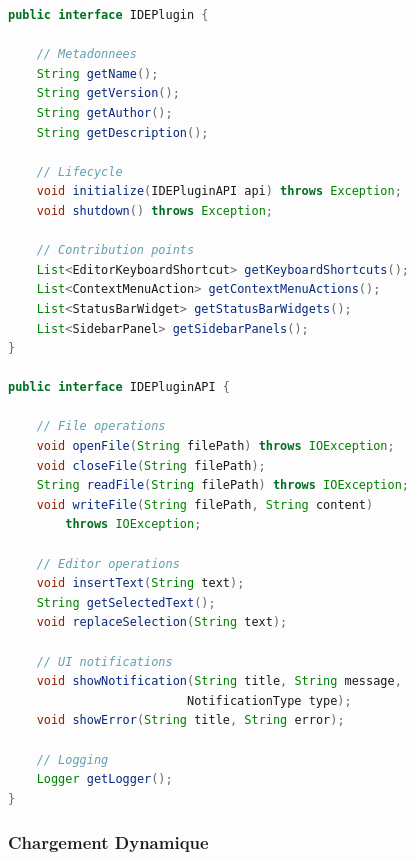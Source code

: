 \documentclass[11pt,a4paper,hidelinks]{book}
\begin{document}
\begin{lstlisting}[language=Java, caption={Interface du Plugin}]
public interface IDEPlugin {
    
    // Metadonnees
    String getName();
    String getVersion();
    String getAuthor();
    String getDescription();
    
    // Lifecycle
    void initialize(IDEPluginAPI api) throws Exception;
    void shutdown() throws Exception;
    
    // Contribution points
    List<EditorKeyboardShortcut> getKeyboardShortcuts();
    List<ContextMenuAction> getContextMenuActions();
    List<StatusBarWidget> getStatusBarWidgets();
    List<SidebarPanel> getSidebarPanels();
}

public interface IDEPluginAPI {
    
    // File operations
    void openFile(String filePath) throws IOException;
    void closeFile(String filePath);
    String readFile(String filePath) throws IOException;
    void writeFile(String filePath, String content) 
        throws IOException;
    
    // Editor operations
    void insertText(String text);
    String getSelectedText();
    void replaceSelection(String text);
    
    // UI notifications
    void showNotification(String title, String message, 
                         NotificationType type);
    void showError(String title, String error);
    
    // Logging
    Logger getLogger();
}
\end{lstlisting}

\subsubsection{Chargement Dynamique}
\end{document}
